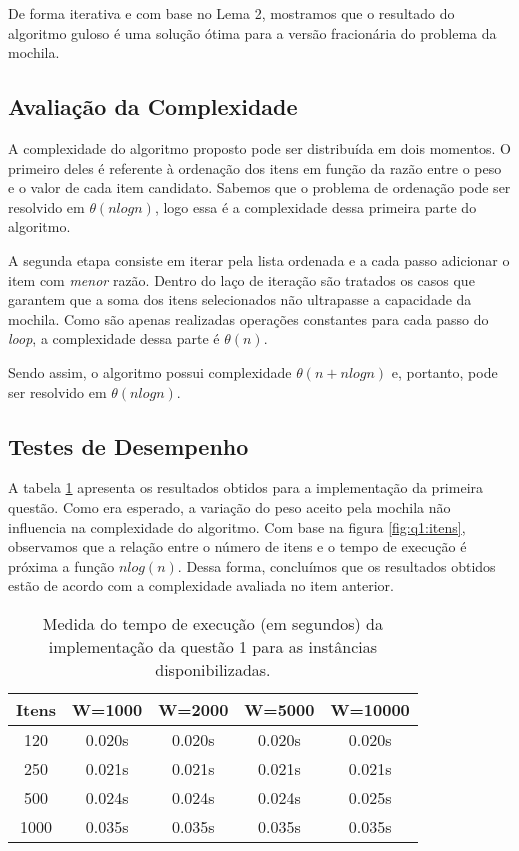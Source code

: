\documentclass[a4paper, 11pt]{article}
\begin{document}
De forma iterativa e com base no Lema 2, mostramos que o resultado do algoritmo guloso é uma solução ótima para a versão fracionária do problema da mochila.

\subsection{Avaliação da Complexidade}

A complexidade do algoritmo proposto pode ser distribuída em dois momentos.
O primeiro deles é referente à ordenação dos itens em função da razão entre o peso e o valor de cada item candidato.
Sabemos que o problema de ordenação pode ser resolvido em $\theta(nlogn)$, logo essa é a complexidade dessa primeira parte do algoritmo.

A segunda etapa consiste em iterar pela lista ordenada e a cada passo adicionar o item com \emph{menor} razão.
Dentro do laço de iteração são tratados os casos que garantem que a soma dos itens selecionados não ultrapasse a capacidade da mochila.
Como são apenas realizadas operações constantes para cada passo do \emph{loop}, a complexidade dessa parte é $\theta(n)$.

Sendo assim, o algoritmo possui complexidade $\theta(n  + nlogn)$ e, portanto, pode ser resolvido em $\theta(nlogn)$.

\subsection{Testes de Desempenho}

A tabela \ref{tab:q1:bench} apresenta os resultados obtidos para a implementação da primeira questão.
Como era esperado, a variação do peso aceito pela mochila não influencia na complexidade do algoritmo.
Com base na figura \ref{fig:q1:itens}, observamos que a relação entre o número de itens e o tempo de execução é próxima a função $nlog(n)$.
Dessa forma, concluímos que os resultados obtidos estão de acordo com a complexidade avaliada no item anterior.

\begin{table}[htb]
\centering
\begin{tabular}{c|c|c|c|c}
Itens & W=1000 & W=2000 & W=5000 & W=10000 \\
\hline
120 & 0.020s    & 0.020s    & 0.020s    & 0.020s    \\
250 & 0.021s    & 0.021s    & 0.021s    & 0.021s    \\
500 & 0.024s    & 0.024s    & 0.024s    & 0.025s    \\
1000 & 0.035s   & 0.035s    & 0.035s    & 0.035s    \\
\end{tabular}
\caption{Medida do tempo de execução (em segundos) da implementação da questão 1 para as instâncias disponibilizadas.}
\label{tab:q1:bench}
\end{table}
\end{document}
